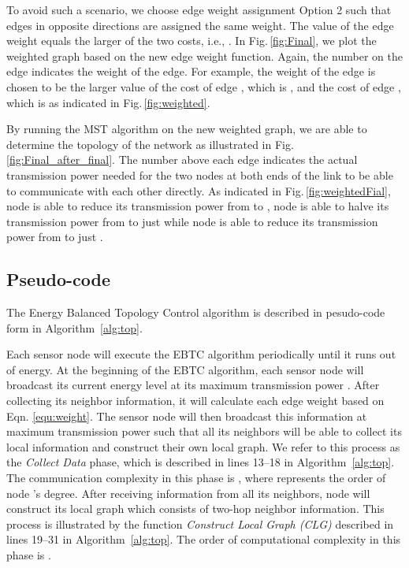 \documentclass[journal,12pt,onecolumn]{IEEEtran}
\begin{document}
To avoid such a scenario, we choose edge weight assignment Option 2
such that edges in opposite directions are assigned the same
weight. The value of the edge weight equals the larger of the two
costs, i.e., . In
Fig.\,\ref{fig:Final}, we plot the weighted graph based on the new
edge weight function. Again, the number on the edge indicates the
weight of the edge. For example, the weight of the edge  is
chosen to be the larger value of the cost of edge , which is
, and the cost of edge , which is  as indicated in
Fig.\,\ref{fig:weighted}.

By running the MST algorithm on the new weighted graph, we are able to
determine the topology of the network as illustrated in
Fig.\,\ref{fig:Final_after_final}. The number above each edge
indicates the actual transmission power needed for the two nodes at
both ends of the link to be able to communicate with each other
directly. As indicated in Fig.\,\ref{fig:weightedFial}, node  is
able to reduce its transmission power from  to
, node  is able to halve its transmission power from 
to just  while node  is able to reduce its transmission power
from  to just .





\subsection{Pseudo-code}
The Energy Balanced Topology Control algorithm is described in
pesudo-code form in Algorithm \,\ref{alg:top}.

Each sensor node will execute the EBTC algorithm periodically until
it runs out of energy. At the beginning of the EBTC algorithm, each
sensor node will broadcast its current energy level at its maximum
transmission power . After collecting its neighbor
information, it will calculate each edge weight based on
Eqn.\,\,\ref{equ:weight}. The sensor node will then broadcast this
information at maximum transmission power  such
that all its neighbors will be able to collect its local information
and construct their own local graph. We refer to this process as
the {\em Collect Data} phase, which is described in lines 13--18 in
Algorithm \,\ref{alg:top}. The communication complexity in this phase
is , where  represents the order of node 's
degree. After receiving information from all its neighbors, node 
will construct its local graph  which consists of two-hop
neighbor information. This process is illustrated by the function
{\em Construct Local Graph (CLG)} described in lines 19--31 in
Algorithm \,\ref{alg:top}. The order of computational complexity in
this phase is .
\end{document}
